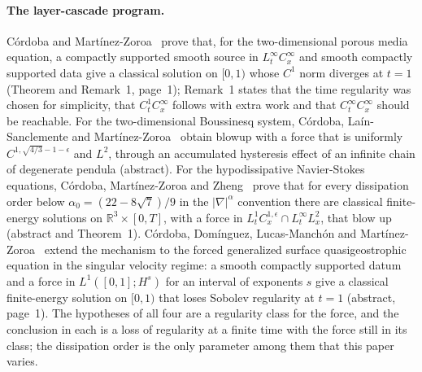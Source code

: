 \documentclass[11pt]{article}
\theoremstyle{remark}
\newcommand{\ev}[1]{\hspace{0.2em}{\small\textsf{[#1]}}}
\begin{document}
\paragraph{The layer-cascade program.} C\'ordoba and Mart\'inez-Zoroa~\cite{cmzi} prove that, for the
two-dimensional porous media equation, a compactly supported smooth source in $L^{\infty}_{t}C^{\infty}_{x}$
and smooth compactly supported data give a classical solution on $[0,1)$ whose $C^{1}$ norm diverges at $t=1$
\ev{V} (Theorem and Remark~1, page~1); Remark~1 states that the time regularity was chosen for simplicity,
that $C^{1}_{t}C^{\infty}_{x}$ follows with extra work and that $C^{\infty}_{t}C^{\infty}_{x}$ should be
reachable. For the two-dimensional Boussinesq system, C\'ordoba, La\'in-Sanclemente and
Mart\'inez-Zoroa~\cite{clsmz} obtain blowup with a force that is uniformly
$C^{1,\sqrt{4/3}-1-\epsilon}$ and $L^{2}$, through an accumulated hysteresis effect of an infinite chain of
degenerate pendula \ev{V} (abstract). For the hypodissipative Navier-Stokes equations, C\'ordoba,
Mart\'inez-Zoroa and Zheng~\cite{cmz} prove that for every dissipation order below
$\alpha_{0}=(22-8\sqrt7)/9$ in the $|\nabla|^{\alpha}$ convention there are classical finite-energy solutions
on $\mathbb R^{3}\times[0,T]$, with a force in $L^{1}_{t}C^{1,\epsilon}_{x}\cap L^{\infty}_{t}L^{2}_{x}$,
that blow up \ev{V} (abstract and Theorem~1). C\'ordoba, Dom\'inguez, Lucas-Manch\'on and
Mart\'inez-Zoroa~\cite{cdlm} extend the mechanism to the forced generalized surface quasigeostrophic equation
in the singular velocity regime: a smooth compactly supported datum and a force in $L^{1}([0,1];H^{s})$ for an
interval of exponents $s$ give a classical finite-energy solution on $[0,1)$ that loses Sobolev regularity at
$t=1$ \ev{V} (abstract, page~1). The hypotheses of all four are a regularity class for the force, and the
conclusion in each is a loss of regularity at a finite time with the force still in its class; the
dissipation order is the only parameter among them that this paper varies.
\end{document}
